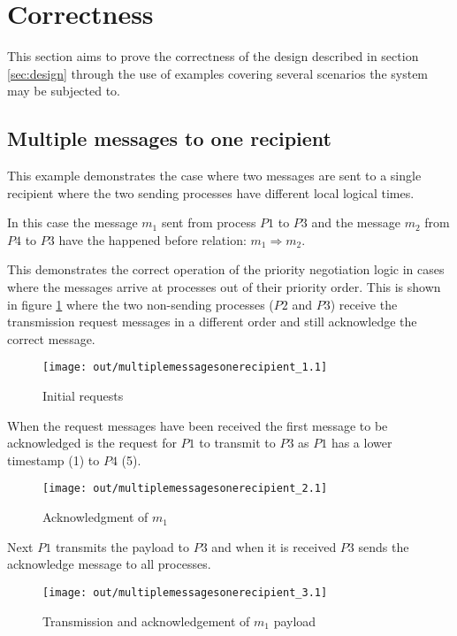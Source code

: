 \documentclass[twocolumn]{article}
\begin{document}
\section{Correctness}
\label{sec:correctness}

This section aims to prove the correctness of the design described in section
\ref{sec:design} through the use of examples covering several scenarios the
system may be subjected to.

\subsection{Multiple messages to one recipient}

This example demonstrates the case where two messages are sent to a single
recipient where the two sending processes have different local logical times.

In this case the message $m_{1}$ sent from process $P1$ to $P3$ and the message
$m_{2}$ from $P4$ to $P3$ have the happened before relation: $m_{1} \Rightarrow
m_{2}$.

This demonstrates the correct operation of the priority negotiation logic in
cases where the messages arrive at processes out of their priority order. This
is shown in figure \ref{fig:multiplemessagesonerecipient_1} where the two
non-sending processes ($P2$ and $P3$) receive the transmission request messages
in a different order and still acknowledge the correct message.

\begin{figure}[h!]
  \centering
  \texttt{[image: out/multiplemessagesonerecipient\_1.1]}
  \caption{Initial requests}
  \label{fig:multiplemessagesonerecipient_1}
\end{figure}
\FloatBarrier

When the request messages have been received the first message to be
acknowledged is the request for $P1$ to transmit to $P3$ as $P1$ has a lower
timestamp (1) to $P4$ (5).

\begin{figure}[h!]
  \centering
  \texttt{[image: out/multiplemessagesonerecipient\_2.1]}
  \caption{Acknowledgment of $m_{1}$}
  \label{fig:multiplemessagesonerecipient_2}
\end{figure}
\FloatBarrier

Next $P1$ transmits the payload to $P3$ and when it is received $P3$ sends the
acknowledge message to all processes.

\begin{figure}[h!]
  \centering
  \texttt{[image: out/multiplemessagesonerecipient\_3.1]}
  \caption{Transmission and acknowledgement of $m_{1}$ payload}
  \label{fig:multiplemessagesonerecipient_3}
\end{figure}
\FloatBarrier
\end{document}
